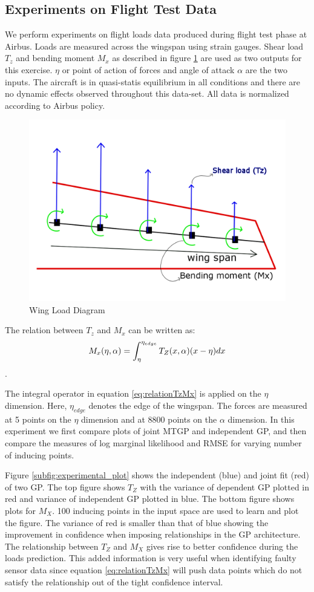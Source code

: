 \subsection{Experiments on Flight Test Data}\label{subsec:expFlightLoadsData}
We perform experiments on flight loads data produced during flight test phase at Airbus. Loads are measured across the wingspan using strain gauges. Shear load \(T_{z}\) and bending moment \(M_{x}\) as described in figure \ref{fig:wingLoadDiagram} are used as two outputs for this exercise. \(\eta\) or point of action of forces and angle of attack \(\alpha\) are the two inputs. The aircraft is in quasi-statis equilibrium in all conditions and there are no dynamic effects observed throughout this data-set. All data is normalized according to Airbus policy.

\begin{figure}
\centering
\includegraphics[width=0.5\columnwidth]{images/part3/wingLoadDiagram.png}
\caption{Wing Load Diagram}
\label{fig:wingLoadDiagram}
\end{figure}


The relation between \(T_{z}\) and \(M_{x}\) can be written as:
\begin{equation}\label{eq:relationTzMx}
\centering
M_{x}(\eta, \alpha) = \int_{\eta}^{\eta_{edge}} T_{Z}(x, \alpha)(x-\eta)dx
\end{equation}.

The integral operator in equation \ref{eq:relationTzMx} is applied on the \(\eta\) dimension. Here, \(\eta_{edge}\) denotes the edge of the wingspan. The forces are measured at 5 points on the \(\eta\) dimension and at 8800 points on the \(\alpha\) dimension. In this experiment we first compare plots of joint MTGP and independent GP, and then compare the measures of log marginal likelihood and RMSE for varying number of inducing points.

Figure \ref{subfig:experimental_plot} shows the independent (blue) and joint fit (red) of two GP. The top figure shows \(T_{Z}\) with the variance of dependent GP plotted in red and variance of independent GP plotted in blue. The bottom figure shows plots for \(M_{X}\). 100 inducing points in the input space are used to learn and plot the figure. The variance of red is smaller than that of blue showing the improvement in confidence when imposing relationships in the GP architecture. The relationship between \(T_{Z}\) and \(M_{X}\) gives rise to better confidence during the loads prediction. This added information is very useful when identifying faulty sensor data since equation \ref{eq:relationTzMx} will push data points which do not satisfy the relationship out of the tight confidence interval.


